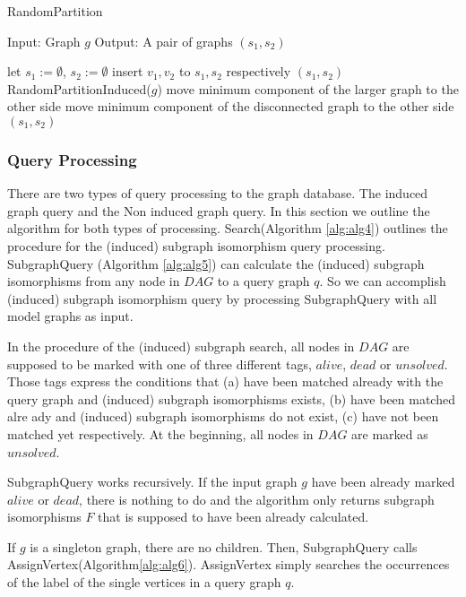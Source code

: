 \begin{algorithm}
\caption{RandomPartition}
\label{alg:alg2}
\begin{algorithmic}
\STATE Input: Graph $g$
\STATE Output: A pair of graphs $(s_1, s_2)$
\end{algorithmic}
\begin{algorithmic}[1]
\STATE let $s_1 := \emptyset$, $s_2 := \emptyset$
	\STATE insert $v_1,v_2$ to $s_1,s_2$ respectively
\ELSE
	\STATE $(s_1, s_2)$ RandomPartitionInduced($g$)
			\STATE move minimum component of the larger graph to the other side
		\ELSE
			\STATE move minimum component of the disconnected graph to the other side
		\ENDIF
	\ENDWHILE
\ENDIF
\RETURN $(s_1,s_2)$
\end{algorithmic}
\end{algorithm}

\subsubsection{Query Processing}
There are two types of query processing to the graph database. The induced graph query and the Non induced graph query. In this section we outline the algorithm
 for both types of processing.
Search(Algorithm \ref{alg:alg4}) outlines the procedure for the (induced) subgraph isomorphism query processing.
SubgraphQuery (Algorithm \ref{alg:alg5}) can calculate the (induced) subgraph isomorphisms from any node in $DAG$ to a query graph $q$.
So we can accomplish (induced) subgraph isomorphism query by processing SubgraphQuery with all model graphs as input.

In the procedure of the (induced) subgraph search, all nodes in $DAG$ are supposed to be marked with one of three different tags, $alive$, $dead$ or $unsolved$.
Those tags express the conditions that (a) have been matched already with the query graph and (induced) subgraph isomorphisms exists, (b) have been matched alre
ady and (induced) subgraph isomorphisms do not exist, (c) have not been matched yet respectively.
At the beginning, all nodes in $DAG$ are marked as $unsolved$.

SubgraphQuery works recursively.
If the input graph $g$ have been already marked $alive$ or $dead$, there is nothing to do and the algorithm only returns subgraph isomorphisms $F$ that is supposed to have been already calculated.

If $g$ is a singleton graph, there are no children.
Then, SubgraphQuery calls AssignVertex(Algorithm\ref{alg:alg6}).
AssignVertex simply searches the occurrences of the label of the single vertices in a query graph $q$.

